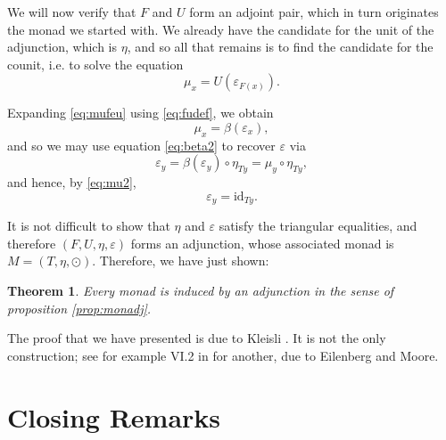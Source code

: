 \documentclass[11pt]{article}
\newtheorem{theorem}{Theorem}
\theoremstyle{nonumberplain}
\newcommand{\id}{\mathrm{id}}
\begin{document}
We will now verify that $F$ and $U$ form an adjoint pair, which in turn originates the monad we started with. We already have the candidate for the unit of the adjunction, which is $\eta$, and so all that remains is to find the candidate for the counit, i.e. to solve the equation
\begin{equation}\label{eq:mufeu}
\mu_x = U(\varepsilon_{F(x)}).
\end{equation}

Expanding \eqref{eq:mufeu} using \eqref{eq:fudef}, we obtain
\begin{equation}
\mu_x = \beta(\varepsilon_{x}),
\end{equation}
and so we may use equation \eqref{eq:beta2} to recover $\varepsilon$ via
\begin{equation}
\varepsilon_y = \beta(\varepsilon_y) \circ \eta_{Ty} = \mu_y \circ \eta_{Ty},
\end{equation}
and hence, by \eqref{eq:mu2},
\begin{equation}
\varepsilon_y = \id_{Ty}.
\end{equation}

It is not difficult to show that $\eta$ and $\varepsilon$ satisfy the triangular equalities, and therefore $(F, U, \eta, \varepsilon)$ forms an adjunction, whose associated monad is $M = (T,\eta,\odot)$. Therefore, we have just shown:

\begin{theorem}
Every monad is induced by an adjunction in the sense of proposition \ref{prop:monadj}.
\end{theorem}

The proof that we have presented is due to Kleisli \cite{kleisli}. It is not the only construction; see for example VI.2 in \cite{maclane} for another, due to Eilenberg and Moore.

\section{Closing Remarks}
\end{document}
